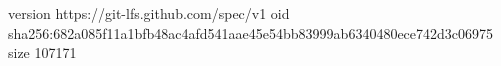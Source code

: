 version https://git-lfs.github.com/spec/v1
oid sha256:682a085f11a1bfb48ac4afd541aae45e54bb83999ab6340480ece742d3c06975
size 107171

